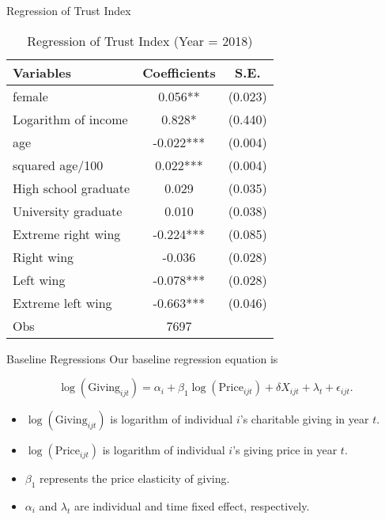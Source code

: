 \documentclass[
  ignorenonframetext,
]{beamer}
\providecommand{\tightlist}{%
  \setlength{\itemsep}{0pt}\setlength{\parskip}{0pt}}
\begin{document}
\begin{frame}{Regression of Trust Index}
\protect\hypertarget{regression-of-trust-index}{}
\begin{table}

\caption{\label{tab:kableTabTrustReg}Regression of Trust Index (Year = 2018)}
\centering
\begin{tabular}[t]{lcc}
\toprule
Variables & Coefficients & S.E.\\
\midrule
female & 0.056** & (0.023)\\
Logarithm of income & 0.828* & (0.440)\\
age & -0.022*** & (0.004)\\
squared age/100 & 0.022*** & (0.004)\\
High school graduate & 0.029 & (0.035)\\
University graduate & 0.010 & (0.038)\\
Extreme right wing & -0.224*** & (0.085)\\
Right wing & -0.036 & (0.028)\\
Left wing & -0.078*** & (0.028)\\
Extreme left wing & -0.663*** & (0.046)\\
Obs & 7697 & \\
\bottomrule
\end{tabular}
\end{table}
\end{frame}

\begin{frame}{Baseline Regressions}
\protect\hypertarget{baseline-regressions}{}
Our baseline regression equation is

\[
    \log(\text{Giving}_{ijt}) = 
    \alpha_i + \beta_1 \log(\text{Price}_{ijt}) + \delta X_{ijt} + \lambda_t + \epsilon_{ijt}.
\]

\begin{itemize}
\tightlist
\item
  \(\log(\text{Giving}_{ijt})\) is logarithm of individual \(i\)'s
  charitable giving in year \(t\).
\item
  \(\log(\text{Price}_{ijt})\) is logarithm of individual \(i\)'s giving
  price in year \(t\).
\item
  \(\beta_1\) represents the price elasticity of giving.
\item
  \(\alpha_i\) and \(\lambda_t\) are individual and time fixed effect,
  respectively.
\end{itemize}
\end{frame}
\end{document}
